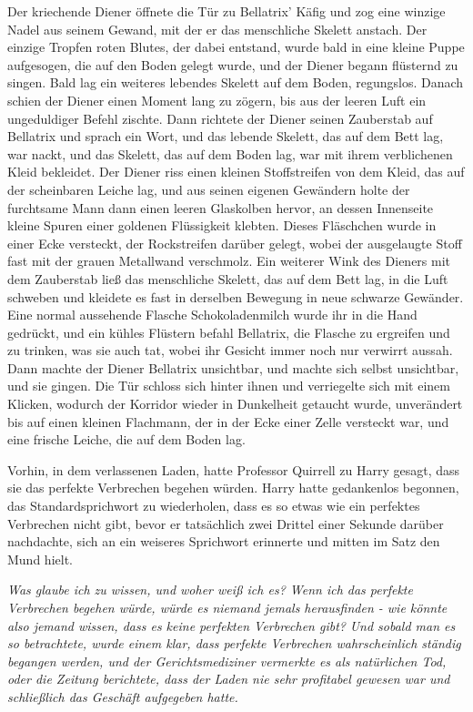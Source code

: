 Der kriechende Diener öffnete die Tür zu Bellatrix' Käfig und zog eine winzige
Nadel aus seinem Gewand, mit der er das menschliche Skelett anstach. Der einzige
Tropfen roten Blutes, der dabei entstand, wurde bald in eine kleine Puppe
aufgesogen, die auf den Boden gelegt wurde, und der Diener begann flüsternd zu
singen. Bald lag ein weiteres lebendes Skelett auf dem Boden, regungslos. Danach
schien der Diener einen Moment lang zu zögern, bis aus der leeren Luft ein
ungeduldiger Befehl zischte. Dann richtete der Diener seinen Zauberstab auf
Bellatrix und sprach ein Wort, und das lebende Skelett, das auf dem Bett lag,
war nackt, und das Skelett, das auf dem Boden lag, war mit ihrem verblichenen
Kleid bekleidet. Der Diener riss einen kleinen Stoffstreifen von dem Kleid, das
auf der scheinbaren Leiche lag, und aus seinen eigenen Gewändern holte der
furchtsame Mann dann einen leeren Glaskolben hervor, an dessen Innenseite kleine
Spuren einer goldenen Flüssigkeit klebten. Dieses Fläschchen wurde in einer Ecke
versteckt, der Rockstreifen darüber gelegt, wobei der ausgelaugte Stoff fast mit
der grauen Metallwand verschmolz. Ein weiterer Wink des Dieners mit dem
Zauberstab ließ das menschliche Skelett, das auf dem Bett lag, in die Luft
schweben und kleidete es fast in derselben Bewegung in neue schwarze Gewänder.
Eine normal aussehende Flasche Schokoladenmilch wurde ihr in die Hand gedrückt,
und ein kühles Flüstern befahl Bellatrix, die Flasche zu ergreifen und zu
trinken, was sie auch tat, wobei ihr Gesicht immer noch nur verwirrt aussah.
Dann machte der Diener Bellatrix unsichtbar, und machte sich selbst unsichtbar,
und sie gingen. Die Tür schloss sich hinter ihnen und verriegelte sich mit einem
Klicken, wodurch der Korridor wieder in Dunkelheit getaucht wurde, unverändert
bis auf einen kleinen Flachmann, der in der Ecke einer Zelle versteckt war, und
eine frische Leiche, die auf dem Boden lag.

Vorhin, in dem verlassenen Laden, hatte Professor Quirrell zu Harry gesagt, dass
sie das perfekte Verbrechen begehen würden. Harry hatte gedankenlos begonnen,
das Standardsprichwort zu wiederholen, dass es so etwas wie ein perfektes
Verbrechen nicht gibt, bevor er tatsächlich zwei Drittel einer Sekunde darüber
nachdachte, sich an ein weiseres Sprichwort erinnerte und mitten im Satz den
Mund hielt.

\emph{Was glaube ich zu wissen, und woher weiß ich es? Wenn ich das perfekte Verbrechen begehen würde, würde es niemand jemals herausfinden - wie könnte also jemand wissen, dass es keine perfekten Verbrechen gibt?}
\emph{Und sobald man es so betrachtete, wurde einem klar, dass perfekte Verbrechen wahrscheinlich ständig begangen werden, und der Gerichtsmediziner vermerkte es als natürlichen Tod, oder die Zeitung berichtete, dass der Laden nie sehr profitabel gewesen war und schließlich das Geschäft aufgegeben hatte.}

